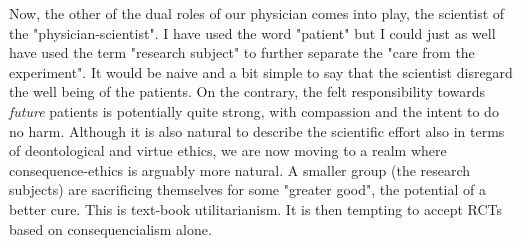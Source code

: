 \documentclass[12p]{article}
\begin{document}
Now, the other of the dual roles of our physician comes into play, the scientist of the "physician-scientist".
I have used the word "patient" but I could just as well have used the term "research subject" to further separate the "care from the experiment".
It would be naive and a bit simple to say that the scientist disregard the well being of the patients.
On the contrary, the felt responsibility towards \emph{future} patients is potentially quite strong, with compassion and the intent to do no harm.
Although it is also natural to describe the scientific effort also in terms of deontological and virtue ethics, we are now moving to a realm where consequence-ethics is arguably more natural.
A smaller group (the research subjects) are sacrificing themselves for some "greater good", the potential of a better cure.
This is text-book utilitarianism.%
It is then tempting to accept RCTs based on consequencialism alone.
\end{document}
